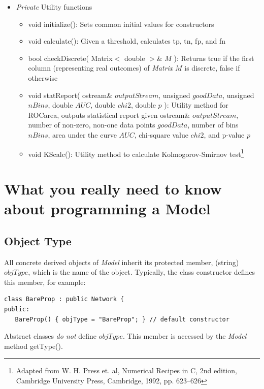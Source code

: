 \documentclass{report}
\begin{document}
\begin{itemize}
\item {\em Private} Utility functions
\begin{itemize}
\item void initialize(): Sets common initial values for constructors
\item void calculate(): Given a threshold, calculates tp, tn, fp, and
      fn
\item bool checkDiscrete( Matrix$<$ double $>$\& $M$ ): Returns true
      if the first column (representing real outcomes) of {\em Matrix}
      $M$ is discrete, false if otherwise
\item void statReport( ostream\& $outputStream$, unsigned $goodData$,
      unsigned $nBins$, double $AUC$, double $chi2$, double $p$ ):
      Utility method for ROCarea, outputs statistical report given
      ostream\& $outputStream$, number of non-zero, non-one data
      points $goodData$, number of bins $nBins$, area under the curve
      $AUC$, chi-square value $chi2$, and p-value $p$
\item void KScalc(): Utility method to calculate Kolmogorov-Smirnov
      test\footnote{Adapted from W. H. Press et. al, Numerical Recipes
      in C, 2nd edition, Cambridge University Press, Cambridge, 1992,
      pp.
      623--626}  
\end{itemize}

\end{itemize}

\section{What you really need to know about programming a Model}

\subsection{Object Type}\label{objType}

All concrete derived objects of {\em Model} inherit its protected
member, (string) $objType$, which is the name of the object.
Typically, the class constructor defines this member, for example:

\begin{verbatim}
class BareProp : public Network {
public:
   BareProp() { objType = "BareProp"; } // default constructor
\end{verbatim}

Abstract classes {\em do not} define $objType$. This member is
accessed by the {\em Model} method getType().
\end{document}

